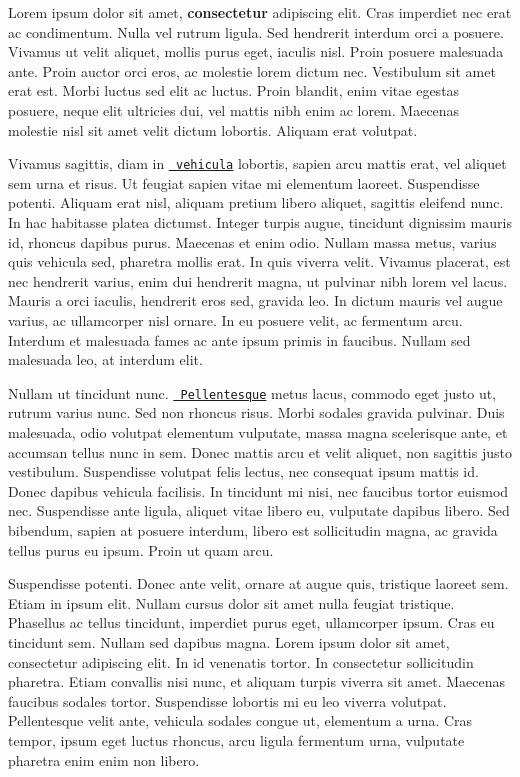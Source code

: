 Lorem ipsum dolor sit amet, {\bfseries{consectetur}} adipiscing elit. Cras imperdiet nec erat ac condimentum. Nulla vel rutrum ligula. Sed hendrerit interdum orci a posuere. Vivamus ut velit aliquet, mollis purus eget, iaculis nisl. Proin posuere malesuada ante. Proin auctor orci eros, ac molestie lorem dictum nec. Vestibulum sit amet erat est. Morbi luctus sed elit ac luctus. Proin blandit, enim vitae egestas posuere, neque elit ultricies dui, vel mattis nibh enim ac lorem. Maecenas molestie nisl sit amet velit dictum lobortis. Aliquam erat volutpat.

Vivamus sagittis, diam in \href{https://github.com/markdown-it/markdown-it}{\texttt{ vehicula}} lobortis, sapien arcu mattis erat, vel aliquet sem urna et risus. Ut feugiat sapien vitae mi elementum laoreet. Suspendisse potenti. Aliquam erat nisl, aliquam pretium libero aliquet, sagittis eleifend nunc. In hac habitasse platea dictumst. Integer turpis augue, tincidunt dignissim mauris id, rhoncus dapibus purus. Maecenas et enim odio. Nullam massa metus, varius quis vehicula sed, pharetra mollis erat. In quis viverra velit. Vivamus placerat, est nec hendrerit varius, enim dui hendrerit magna, ut pulvinar nibh lorem vel lacus. Mauris a orci iaculis, hendrerit eros sed, gravida leo. In dictum mauris vel augue varius, ac ullamcorper nisl ornare. In eu posuere velit, ac fermentum arcu. Interdum et malesuada fames ac ante ipsum primis in faucibus. Nullam sed malesuada leo, at interdum elit.

Nullam ut tincidunt nunc. \href{https://github.com/markdown-it}{\texttt{ Pellentesque}} metus lacus, commodo eget justo ut, rutrum varius nunc. Sed non rhoncus risus. Morbi sodales gravida pulvinar. Duis malesuada, odio volutpat elementum vulputate, massa magna scelerisque ante, et accumsan tellus nunc in sem. Donec mattis arcu et velit aliquet, non sagittis justo vestibulum. Suspendisse volutpat felis lectus, nec consequat ipsum mattis id. Donec dapibus vehicula facilisis. In tincidunt mi nisi, nec faucibus tortor euismod nec. Suspendisse ante ligula, aliquet vitae libero eu, vulputate dapibus libero. Sed bibendum, sapien at posuere interdum, libero est sollicitudin magna, ac gravida tellus purus eu ipsum. Proin ut quam arcu.

Suspendisse potenti. Donec ante velit, ornare at augue quis, tristique laoreet sem. Etiam in ipsum elit. Nullam cursus dolor sit amet nulla feugiat tristique. Phasellus ac tellus tincidunt, imperdiet purus eget, ullamcorper ipsum. Cras eu tincidunt sem. Nullam sed dapibus magna. Lorem ipsum dolor sit amet, consectetur adipiscing elit. In id venenatis tortor. In consectetur sollicitudin pharetra. Etiam convallis nisi nunc, et aliquam turpis viverra sit amet. Maecenas faucibus sodales tortor. Suspendisse lobortis mi eu leo viverra volutpat. Pellentesque velit ante, vehicula sodales congue ut, elementum a urna. Cras tempor, ipsum eget luctus rhoncus, arcu ligula fermentum urna, vulputate pharetra enim enim non libero.

